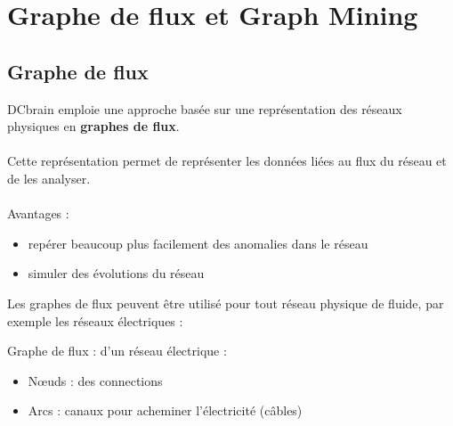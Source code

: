 	\section{Graphe de flux et Graph Mining}
	\subsection{Graphe de flux}
	\begin{frame}
		DCbrain emploie une approche basée sur une représentation des réseaux physiques en \textbf{graphes de flux}.
		\\~\\
		\pause
		Cette représentation permet de représenter les données liées au flux du réseau et de les analyser.
		\\~\\
		\pause
		Avantages :
		\begin{itemize}
		\pause
		\item repérer beaucoup plus facilement des anomalies dans le réseau
		\pause
		\item simuler des évolutions du réseau
		\end{itemize}
	\end{frame}
	\begin{frame}
		Les graphes de flux peuvent être utilisé pour tout réseau physique de fluide, par exemple les réseaux électriques :
		\pause
		\begin{exampleblock}{Graphe de flux : d'un réseau électrique :}
		\begin{itemize}
		\item Nœuds : des connections
		\item Arcs : canaux pour acheminer l'électricité (câbles)
		\end{itemize}
		\end{exampleblock}
	\end{frame}	
	
